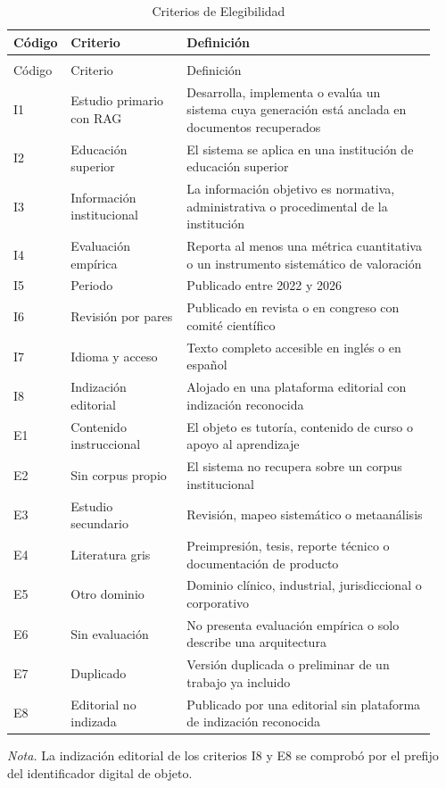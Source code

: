 \documentclass[man,12pt,floatsintext,donotrepeattitle]{apa7}
\begin{document}
{\def\baselinestretch{1}\small\selectfont
\begin{longtable}{@{}>{\raggedright\arraybackslash}p{0.085\linewidth}>{\raggedright\arraybackslash}p{0.273\linewidth}>{\raggedright\arraybackslash}p{0.583\linewidth}@{}}
\caption{Criterios de Elegibilidad}\label{tab:1}\\
\toprule
Código & Criterio & Definición \\
\midrule
\endfirsthead
\multicolumn{3}{@{}l}{\textit{Tabla 1 (continuación)}}\\
\toprule
Código & Criterio & Definición \\
\midrule
\endhead
I1 & Estudio primario con RAG & Desarrolla, implementa o evalúa un sistema cuya generación está anclada en documentos recuperados \\
I2 & Educación superior & El sistema se aplica en una institución de educación superior \\
I3 & Información institucional & La información objetivo es normativa, administrativa o procedimental de la institución \\
I4 & Evaluación empírica & Reporta al menos una métrica cuantitativa o un instrumento sistemático de valoración \\
I5 & Periodo & Publicado entre 2022 y 2026 \\
I6 & Revisión por pares & Publicado en revista o en congreso con comité científico \\
I7 & Idioma y acceso & Texto completo accesible en inglés o en español \\
I8 & Indización editorial & Alojado en una plataforma editorial con indización reconocida \\
E1 & Contenido instruccional & El objeto es tutoría, contenido de curso o apoyo al aprendizaje \\
E2 & Sin corpus propio & El sistema no recupera sobre un corpus institucional \\
E3 & Estudio secundario & Revisión, mapeo sistemático o metaanálisis \\
E4 & Literatura gris & Preimpresión, tesis, reporte técnico o documentación de producto \\
E5 & Otro dominio & Dominio clínico, industrial, jurisdiccional o corporativo \\
E6 & Sin evaluación & No presenta evaluación empírica o solo describe una arquitectura \\
E7 & Duplicado & Versión duplicada o preliminar de un trabajo ya incluido \\
E8 & Editorial no indizada & Publicado por una editorial sin plataforma de indización reconocida \\
\bottomrule
\end{longtable}}
\vspace{-1.2em}
{\footnotesize\noindent\textit{Nota.} La indización editorial de los criterios I8 y E8 se comprobó por el prefijo del identificador digital de objeto.\par}
\vspace{1em}
\end{document}

